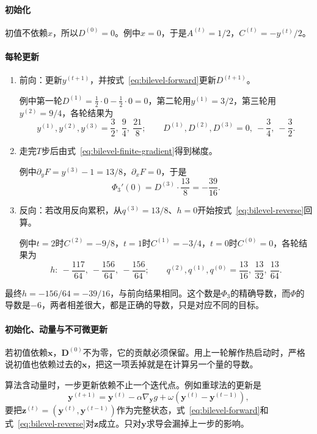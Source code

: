 \paragraph{初始化}
初值不依赖$x$，所以$D^{(0)}=0$。例中$x=0$，于是$A^{(t)}=1/2$，$C^{(t)}=-y^{(t)}/2$。

\paragraph{每轮更新}
\begin{enumerate}
 \item 前向：更新$y^{(t+1)}$，并按式~\eqref{eq:bilevel-forward}更新$D^{(t+1)}$。

 例中第一轮$D^{(1)}=\frac12\cdot0-\frac12\cdot0=0$，第二轮用$y^{(1)}=3/2$，第三轮用$y^{(2)}=9/4$，各轮结果为
 \[
  y^{(1)},y^{(2)},y^{(3)}=\frac32,\ \frac94,\ \frac{21}{8};\qquad
  D^{(1)},D^{(2)},D^{(3)}=0,\ -\frac34,\ -\frac32.
 \]

 \item 走完$T$步后由式~\eqref{eq:bilevel-finite-gradient}得到梯度。

 例中$\partial_yF=y^{(3)}-1=13/8$，$\partial_xF=0$，于是
 \[
  \Phi_3'(0)=D^{(3)}\cdot\frac{13}{8}=-\frac{39}{16}.
 \]

 \item 反向：若改用反向累积，从$q^{(3)}=13/8$、$h=0$开始按式~\eqref{eq:bilevel-reverse}回算。

 例中$t=2$时$C^{(2)}=-9/8$，$t=1$时$C^{(1)}=-3/4$，$t=0$时$C^{(0)}=0$，各轮结果为
 \[
  h:\ -\frac{117}{64},\ -\frac{156}{64},\ -\frac{156}{64};\qquad
  q^{(2)},q^{(1)},q^{(0)}=\frac{13}{16},\ \frac{13}{32},\ \frac{13}{64}.
 \]
\end{enumerate}

最终$h=-156/64=-39/16$，与前向结果相同。这个数是$\Phi_3$的精确导数，而$\Phi$的导数是$-6$，两者相差很大，都是正确的导数，只是对应不同的目标。

\paragraph{初始化、动量与不可微更新}
若初值依赖$\bm{x}$，$\bm{D}^{(0)}$不为零，它的贡献必须保留。用上一轮解作热启动时，严格说初值也依赖过去的$\bm{x}$，把这一项丢掉就是在计算另一个量的导数。

算法含动量时，一步更新依赖不止一个迭代点。例如重球法的更新是
\[
 \bm{y}^{(t+1)}=\bm{y}^{(t)}-\alpha\nabla_{\bm{y}}g+\omega(\bm{y}^{(t)}-\bm{y}^{(t-1)}),
\]
要把$\bm{z}^{(t)}=(\bm{y}^{(t)},\bm{y}^{(t-1)})$作为完整状态，式~\eqref{eq:bilevel-forward}和式~\eqref{eq:bilevel-reverse}对$\bm{z}$成立。只对$\bm{y}$求导会漏掉上一步的影响。

